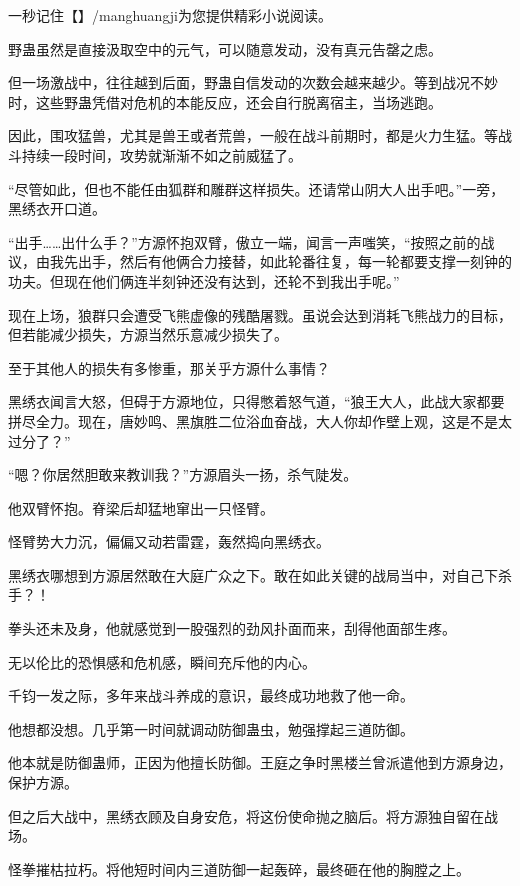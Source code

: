 
\begin{this_body}

一秒记住【】/manghuangji为您提供精彩小说阅读。

野蛊虽然是直接汲取空中的元气，可以随意发动，没有真元告罄之虑。

但一场激战中，往往越到后面，野蛊自信发动的次数会越来越少。等到战况不妙时，这些野蛊凭借对危机的本能反应，还会自行脱离宿主，当场逃跑。

因此，围攻猛兽，尤其是兽王或者荒兽，一般在战斗前期时，都是火力生猛。等战斗持续一段时间，攻势就渐渐不如之前威猛了。

“尽管如此，但也不能任由狐群和雕群这样损失。还请常山阴大人出手吧。”一旁，黑绣衣开口道。

“出手……出什么手？”方源怀抱双臂，傲立一端，闻言一声嗤笑，“按照之前的战议，由我先出手，然后有他俩合力接替，如此轮番往复，每一轮都要支撑一刻钟的功夫。但现在他们俩连半刻钟还没有达到，还轮不到我出手呢。”

现在上场，狼群只会遭受飞熊虚像的残酷屠戮。虽说会达到消耗飞熊战力的目标，但若能减少损失，方源当然乐意减少损失了。

至于其他人的损失有多惨重，那关乎方源什么事情？

黑绣衣闻言大怒，但碍于方源地位，只得憋着怒气道，“狼王大人，此战大家都要拼尽全力。现在，唐妙鸣、黑旗胜二位浴血奋战，大人你却作壁上观，这是不是太过分了？”

“嗯？你居然胆敢来教训我？”方源眉头一扬，杀气陡发。

他双臂怀抱。脊梁后却猛地窜出一只怪臂。

怪臂势大力沉，偏偏又动若雷霆，轰然捣向黑绣衣。

黑绣衣哪想到方源居然敢在大庭广众之下。敢在如此关键的战局当中，对自己下杀手？！

拳头还未及身，他就感觉到一股强烈的劲风扑面而来，刮得他面部生疼。

无以伦比的恐惧感和危机感，瞬间充斥他的内心。

千钧一发之际，多年来战斗养成的意识，最终成功地救了他一命。

他想都没想。几乎第一时间就调动防御蛊虫，勉强撑起三道防御。

他本就是防御蛊师，正因为他擅长防御。王庭之争时黑楼兰曾派遣他到方源身边，保护方源。

但之后大战中，黑绣衣顾及自身安危，将这份使命抛之脑后。将方源独自留在战场。

怪拳摧枯拉朽。将他短时间内三道防御一起轰碎，最终砸在他的胸膛之上。


\end{this_body}

